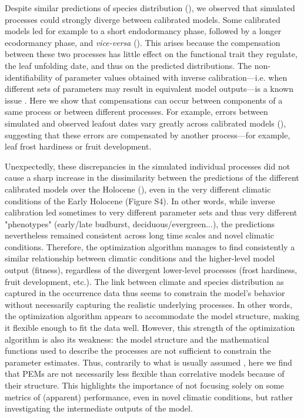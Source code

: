 \documentclass[letterpaper,8pt]{extarticle}  %
\begin{document}
\begin{doublespacing}
\begin{linenumbers}
Despite similar predictions of species distribution (), we observed that simulated processes could strongly diverge between calibrated models. Some calibrated models led for example to a short endodormancy phase, followed by a longer ecodormancy phase, and \textit{vice-versa} (). This arises because the compensation between these two processes has little effect on the functional trait they regulate, the leaf unfolding date, and thus on the predicted distributions. The non-identifiability of parameter values obtained with inverse calibration---i.e. when different sets of parameters may result in equivalent model outputs---is a known issue \citep{He2017, Cameron2022, VanderMeersch2023}. Here we show that compensations can occur between components of a same process or between different processes. For example, errors between simulated and observed leafout dates vary greatly across calibrated models (), suggesting that these errors are compensated by another process---for example, leaf frost hardiness or fruit development. 

Unexpectedly, these discrepancies in the simulated individual processes did not cause a sharp increase in the dissimilarity between the predictions of the different calibrated models over the Holocene (), even in the very different climatic conditions of the Early Holocene (Figure S4). In other words, while inverse calibration led sometimes to very different parameter sets and thus very different "phenotypes" (early/late budburst, deciduous/evergreen...), the predictions nevertheless remained consistent across long time scales and novel climatic conditions. Therefore, the optimization algorithm manages to find consistently a similar relationship between climatic conditions and the higher-level model output (fitness), regardless of the divergent lower-level processes (frost hardiness, fruit development, etc.). The link between climate and species distribution as captured in the occurrence data thus seems to constrain the model's behavior without necessarily capturing the realistic underlying processes. In other words, the optimization algorithm appears to accommodate the model structure, making it flexible enough to fit the data well. However, this strength of the optimization algorithm is also its weakness: the model structure and the mathematical functions used to describe the processes are not sufficient to constrain the parameter estimates. Thus, contrarily to what is usually assumed \citep{Higgins2020}, here we find that PEMs are not necessarily less flexible than correlative models because of their structure. This highlights the importance of not focusing solely on some metrics of (apparent) performance, even in novel climatic conditions, but rather investigating the intermediate outputs of the model.


\end{linenumbers}
\end{doublespacing}
\end{document}
